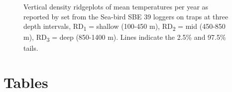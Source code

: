 \documentclass[12pt]{article}\usepackage[]{graphicx}\usepackage[]{color}
\begin{document}
\begin{figure}[htb]

{\centering {} 

}

\caption{Vertical density ridgeplots of mean temperatures per year as reported by set from the Sea-bird SBE 39 loggers on traps at three depth intervals, RD\textsubscript{1} = shallow (100-450 m), RD\textsubscript{2} = mid (450-850 m), RD\textsubscript{3} = deep (850-1400 m). Lines indicate the 2.5\% and 97.5\% tails.}\label{fig:figure18}
\end{figure}
\clearpage

\hypertarget{tables}{%
\section{Tables}\label{tables}}
\end{document}
